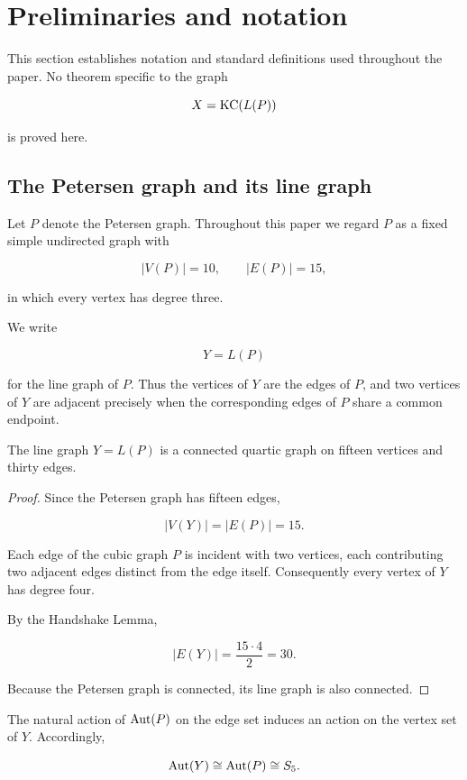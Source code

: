 \section{Preliminaries and notation}

This section establishes notation and standard definitions used throughout
the paper. No theorem specific to the graph

\[
X=\operatorname{KC}(L(P))
\]

is proved here.

\subsection{The Petersen graph and its line graph}

Let \(P\) denote the Petersen graph. Throughout this paper we regard \(P\)
as a fixed simple undirected graph with

\[
|V(P)|=10,
\qquad
|E(P)|=15,
\]

in which every vertex has degree three.

We write

\[
Y=L(P)
\]

for the line graph of \(P\). Thus the vertices of \(Y\) are the edges of
\(P\), and two vertices of \(Y\) are adjacent precisely when the
corresponding edges of \(P\) share a common endpoint.

\begin{proposition}
The line graph \(Y=L(P)\) is a connected quartic graph on fifteen vertices
and thirty edges.
\end{proposition}

\begin{proof}
Since the Petersen graph has fifteen edges,

\[
|V(Y)|=|E(P)|=15.
\]

Each edge of the cubic graph \(P\) is incident with two vertices, each
contributing two adjacent edges distinct from the edge itself.
Consequently every vertex of \(Y\) has degree four.

By the Handshake Lemma,

\[
|E(Y)|
=
\frac{15\cdot4}{2}
=
30.
\]

Because the Petersen graph is connected, its line graph is also connected.
\end{proof}

The natural action of \(\operatorname{Aut}(P)\) on the edge set induces an action on the
vertex set of \(Y\). Accordingly,

\[
\operatorname{Aut}(Y)\cong\operatorname{Aut}(P)\cong S_5.
\]

